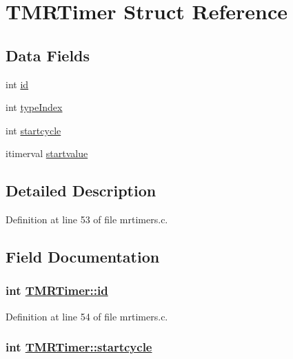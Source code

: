 \hypertarget{structTMRTimer}{
\section{TMRTimer Struct Reference}
\label{structTMRTimer}
}
\subsection*{Data Fields}
\begin{CompactItemize}
\item 
int \hyperlink{structTMRTimer_ca4322de3f2a2e73ef2e26c7f3ce9a27}{id}
\item 
int \hyperlink{structTMRTimer_09f50fe723b1b20ac76d41e7ccc925a5}{type\-Index}
\item 
int \hyperlink{structTMRTimer_43ffe7cabf87a2cbb545d37eafd42236}{startcycle}
\item 
itimerval \hyperlink{structTMRTimer_fab1ebdf9b11ae3bfd43feb3e598226b}{startvalue}
\end{CompactItemize}


\subsection{Detailed Description}




Definition at line 53 of file mrtimers.c.

\subsection{Field Documentation}
\hypertarget{structTMRTimer_ca4322de3f2a2e73ef2e26c7f3ce9a27}{
\subsubsection[id]{\setlength{\rightskip}{0pt plus 5cm}int \hyperlink{structTMRTimer_ca4322de3f2a2e73ef2e26c7f3ce9a27}{TMRTimer::id}}}
\label{structTMRTimer_ca4322de3f2a2e73ef2e26c7f3ce9a27}




Definition at line 54 of file mrtimers.c.\hypertarget{structTMRTimer_43ffe7cabf87a2cbb545d37eafd42236}{
\subsubsection[startcycle]{\setlength{\rightskip}{0pt plus 5cm}int \hyperlink{structTMRTimer_43ffe7cabf87a2cbb545d37eafd42236}{TMRTimer::startcycle}}}
\label{structTMRTimer_43ffe7cabf87a2cbb545d37eafd42236}




